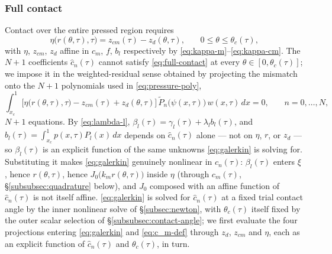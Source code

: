 \subsubsection{Full contact}
Contact over the entire pressed region requires
\begin{equation}
    \eta\big(r(\theta,\tau),\tau\big) = z_{cm}(\tau) - z_d(\theta,\tau)\text{,}\qquad 0\le\theta\le\theta_c(\tau)\text{,}
    \label{eq:full-contact}
\end{equation}
with $\eta$, $z_{cm}$, $z_d$ affine in $c_m$, $f$, $b_l$ respectively by \eqref{eq:kappa-m}--\eqref{eq:kappa-cm}. The $N+1$ coefficients $\hat c_n(\tau)$ cannot satisfy \eqref{eq:full-contact} at every $\theta\in[0,\theta_c(\tau)]$; we impose it in the weighted-residual sense obtained by projecting the mismatch onto the $N+1$ polynomials used in \eqref{eq:pressure-poly},
\begin{equation}
    \int_{x_c}^1 \Big[\eta\big(r(\theta,\tau),\tau\big) - z_{cm}(\tau) + z_d(\theta,\tau)\Big]\,\tilde P_n\big(\psi(x,\tau)\big)\, w(x,\tau)\, dx = 0\text{,}\qquad n=0,\dots,N\text{,}
    \label{eq:galerkin}
\end{equation}
$N+1$ equations. By \eqref{eq:lambda-l}, $\beta_l(\tau)=\gamma_l(\tau)+\lambda_lb_l(\tau)$, and $b_l(\tau)=\int_{x_c}^1p(x,\tau)P_l(x)\,dx$ depends on $\hat c_n(\tau)$ alone --- not on $\eta$, $r$, or $z_d$ --- so $\beta_l(\tau)$ is an explicit function of the same unknowns \eqref{eq:galerkin} is solving for. Substituting it makes \eqref{eq:galerkin} genuinely nonlinear in $\hat c_n(\tau)$: $\beta_l(\tau)$ enters $\xi$, hence $r(\theta,\tau)$, hence $J_0\big(k_mr(\theta,\tau)\big)$ inside $\eta$ (through $c_m(\tau)$, \S\ref{subsubsec:quadrature} below), and $J_0$ composed with an affine function of $\hat c_n(\tau)$ is not itself affine. \eqref{eq:galerkin} is solved for $\hat c_n(\tau)$ at a fixed trial contact angle by the inner nonlinear solve of \S\ref{subsec:newton}, with $\theta_c(\tau)$ itself fixed by the outer scalar selection of \S\ref{subsubsec:contact-angle}; we first evaluate the four projections entering \eqref{eq:galerkin} and \eqref{eq:c_m-def} through $z_d$, $z_{cm}$ and $\eta$, each as an explicit function of $\hat c_n(\tau)$ and $\theta_c(\tau)$, in turn.

